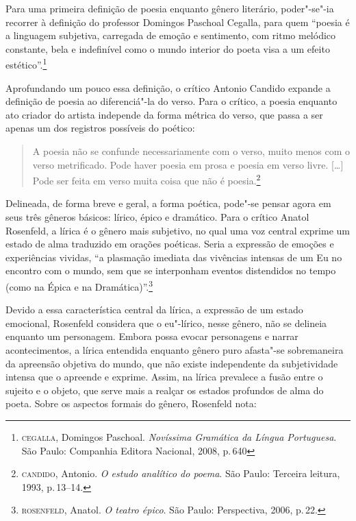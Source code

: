 \documentclass[11pt]{extarticle}
\begin{document}
Para uma primeira definição de poesia enquanto gênero literário, poder"-se"-ia recorrer à definição do professor Domingos Paschoal Cegalla, para quem ``poesia é a linguagem subjetiva, carregada de emoção e sentimento, com ritmo melódico constante, bela e indefinível como o mundo interior do poeta visa a um efeito estético''.\footnote{\textsc{cegalla}, Domingos Paschoal. \textit{Novíssima Gramática da Língua Portuguesa}. São Paulo: Companhia Editora Nacional, 2008, p.\,640}

Aprofundando um pouco essa definição, o crítico Antonio Candido expande a definição de poesia ao diferenciá"-la do verso.
Para o crítico, a poesia enquanto ato criador do artista independe da forma métrica do verso, que passa a ser apenas um dos registros possíveis do poético:

\begin{quote}
A poesia não se confunde necessariamente com o verso, muito menos com o verso metrificado. Pode haver poesia em prosa e poesia em verso livre. [\ldots]
Pode ser feita em verso muita coisa que não é poesia.\footnote{\textsc{candido}, Antonio. \textit{O estudo analítico do poema}. São Paulo: Terceira leitura, 1993, p.\,13--14.}
\end{quote}

Delineada, de forma breve e geral, a forma poética, pode"-se pensar agora em seus três gêneros básicos: lírico, épico e dramático.
Para o crítico Anatol Rosenfeld, a lírica é o gênero mais subjetivo, no qual uma voz central exprime um estado de alma traduzido em orações poéticas.
Seria a expressão de emoções e experiências vividas, ``a plasmação imediata das vivências intensas de um Eu no encontro com o mundo, sem que se interponham eventos distendidos no tempo (como na Épica e na Dramática)''.\footnote{\textsc{rosenfeld}, Anatol. \textit{O teatro épico}. São Paulo: Perspectiva, 2006, p.\,22.}

Devido a essa característica central da lírica, a expressão de um estado emocional, Rosenfeld considera que o eu"-lírico, nesse gênero, não se delineia enquanto um personagem. Embora possa evocar personagens e narrar acontecimentos, a lírica entendida enquanto gênero puro afasta"-se sobremaneira da apreensão objetiva do mundo, que não existe independente da subjetividade intensa que o apreende e exprime. Assim, na lírica prevalece a fusão entre o sujeito e o objeto, que serve mais a realçar os estados profundos de alma do poeta.
Sobre os aspectos formais do gênero, Rosenfeld nota:
\end{document}
